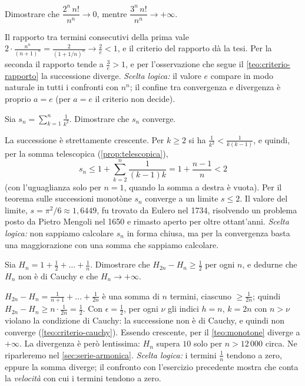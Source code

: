 \begin{esercizio}
Dimostrare che $\dfrac{2^{n}\,n!}{n^{n}}\to0$, mentre $\dfrac{3^{n}\,n!}{n^{n}}\to+\infty$.
\begin{soluzione}
Il rapporto tra termini consecutivi della prima vale
$2\cdot\frac{n^{n}}{(n+1)^{n}}=\frac{2}{(1+1/n)^{n}}\to\frac2e<1$, e il criterio del
rapporto dà la tesi. Per la seconda il rapporto tende a $\frac3e>1$, e per l'osservazione
che segue il \cref{teo:criterio-rapporto} la successione diverge. \emph{Scelta logica:} il
valore $e$ compare in modo naturale in tutti i confronti con $n^{n}$; il confine tra
convergenza e divergenza è proprio $a=e$ (per $a=e$ il criterio non decide).
\end{soluzione}
\end{esercizio}

\begin{esercizio}
Sia $s_{n}=\displaystyle\sum_{k=1}^{n}\frac1{k^{2}}$. Dimostrare che $s_{n}$ converge.
\begin{soluzione}
La successione è strettamente crescente. Per $k\ge2$ si ha
$\frac1{k^{2}}<\frac1{k(k-1)}$, e quindi, per la somma telescopica
(\cref{prop:telescopica}),
\[
  s_{n}\le1+\sum_{k=2}^{n}\frac1{(k-1)k}=1+\frac{n-1}{n}<2
\]
(con l'uguaglianza solo per $n=1$, quando la somma a destra è vuota).
Per il teorema sulle successioni monotòne $s_{n}$ converge a un limite $s\le2$. Il valore
del limite, $s=\pi^{2}/6\approx1{,}6449$, fu trovato da Eulero nel 1734, risolvendo un
problema posto da Pietro Mengoli nel 1650 e rimasto aperto per oltre ottant'anni.
\emph{Scelta logica:} non sappiamo calcolare $s_{n}$ in forma chiusa, ma per la
convergenza basta una maggiorazione con una somma che sappiamo calcolare.
\end{soluzione}
\end{esercizio}

\begin{esercizio}
Sia $H_{n}=1+\frac12+\dots+\frac1n$. Dimostrare che $H_{2n}-H_{n}\ge\frac12$ per ogni $n$,
e dedurne che $H_{n}$ non è di Cauchy e che $H_{n}\to+\infty$.
\begin{soluzione}
$H_{2n}-H_{n}=\frac1{n+1}+\dots+\frac1{2n}$ è una somma di $n$ termini, ciascuno
$\ge\frac1{2n}$; quindi $H_{2n}-H_{n}\ge n\cdot\frac1{2n}=\frac12$. Con $\epsilon=\frac12$,
per ogni $\nu$ gli indici $h=n$, $k=2n$ con $n>\nu$ violano la condizione di Cauchy: la
successione non è di Cauchy, e quindi non converge (\cref{teo:criterio-cauchy}). Essendo
crescente, per il \cref{teo:monotone} diverge a $+\infty$. La divergenza è però
lentissima: $H_{n}$ supera $10$ solo per $n>12\,000$ circa. Ne riparleremo nel
\cref{sec:serie-armonica}. \emph{Scelta logica:} i termini $\frac1n$ tendono a zero,
eppure la somma diverge; il confronto con l'esercizio precedente mostra che conta la
\emph{velocità} con cui i termini tendono a zero.
\end{soluzione}
\end{esercizio}

